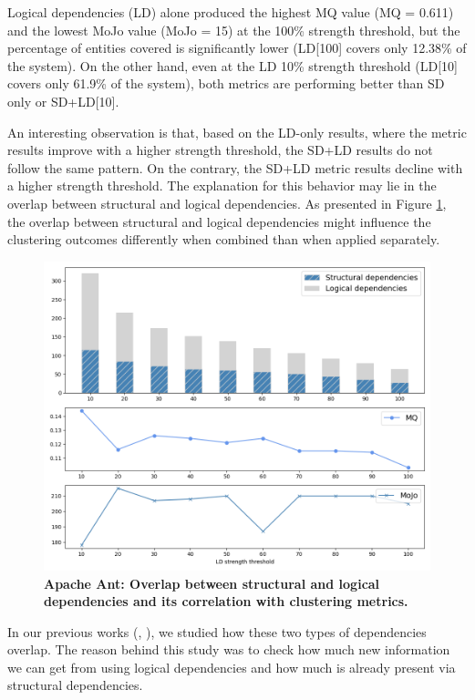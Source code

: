 \documentclass{ieeeaccess}
\begin{document}
Logical dependencies (LD) alone produced the highest MQ value (MQ = 0.611) and the lowest MoJo value (MoJo = 15) at the 100\% strength threshold, but the percentage of entities covered is significantly lower (LD[100] covers only 12.38\% of the system). On the other hand, even at the LD 10\% strength threshold (LD[10] covers only 61.9\% of the system), both metrics are performing better than SD only or SD+LD[10].

An interesting observation is that, based on the LD-only results, where the metric results improve with a higher strength threshold, the SD+LD results do not follow the same pattern. On the contrary, the SD+LD metric results decline with a higher strength threshold. The explanation for this behavior may lie in the overlap between structural and logical dependencies. As presented in Figure \ref{fig:ant_correlation}, the overlap between structural and logical dependencies might influence the clustering outcomes differently when combined than when applied separately.

\begin{figure}[t!]
  \centering
  \includegraphics[width=\columnwidth]{ant_correlation.png}
  \caption{\textbf{Apache Ant: Overlap between structural and logical dependencies and its correlation with clustering metrics.}}
  \label{fig:ant_correlation}
\end{figure}

In our previous works (\cite{b4}, \cite{b5}), we studied how these two types of dependencies overlap. The reason behind this study was to check how much new information we can get from using logical dependencies and how much is already present via structural dependencies.
\end{document}
